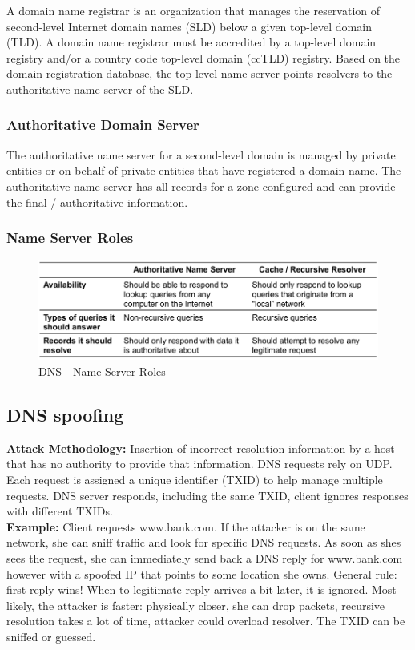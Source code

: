 \documentclass[11pt,oneside,a4paper]{article}
\begin{document}
A domain name registrar is an organization that manages the reservation of second-level Internet domain names (SLD) below a given top-level domain (TLD). A domain name registrar must be accredited by a top-level domain registry and/or a country code top-level domain (ccTLD) registry. Based on the domain registration database, the top-level name server points resolvers to the authoritative name server of the SLD.

\subsubsection{Authoritative Domain Server}

The authoritative name server for a second-level domain is managed by private entities or on behalf of private entities that have registered a domain name. The authoritative name server has all records for a zone configured and can provide the final / authoritative information.

\subsubsection{Name Server Roles}

\begin{figure}[hb]
	\centering
	\includegraphics[width=0.7\linewidth]{figures/dns_name_server_roles}
	\caption{DNS - Name Server Roles}
	\label{fig:dnsnameserverroles}
\end{figure}

\subsection{DNS spoofing}

\textbf{Attack Methodology:} Insertion of incorrect resolution information by a host that has no authority to provide that information. DNS requests rely on UDP. Each request is assigned a unique identifier (TXID) to help manage multiple requests. DNS server responds, including the same TXID, client ignores responses with different TXIDs.\\
\textbf{Example:} Client requests www.bank.com. If the attacker is on the same network, she can sniff traffic and look for specific DNS requests. As soon as shes sees the request, she can immediately send back a DNS reply for www.bank.com however with a spoofed IP that points to some location she owns. General rule: first reply wins! When to legitimate reply arrives a bit later, it is ignored. Most likely, the attacker is faster: physically closer, she can drop packets, recursive resolution takes a lot of time, attacker could overload resolver. The TXID can be sniffed or guessed.
\end{document}
